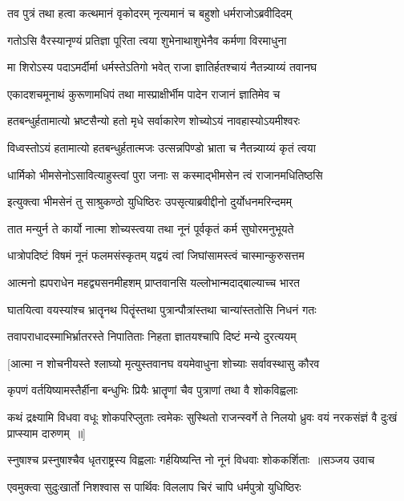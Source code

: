 \twolineshloka
{तव पुत्रं तथा हत्वा कत्थमानं वृकोदरम्}
{नृत्यमानं च बहुशो धर्मराजोऽब्रवीदिदम्}


\twolineshloka
{गतोऽसि वैरस्यानृण्यं प्रतिज्ञा पूरिता त्वया}
{शुभेनाथाशुभेनैव कर्मणा विरमाधुना}


\twolineshloka
{मा शिरोऽस्य पदाऽमर्दीर्मा धर्मस्तेऽतिगो भवेत्}
{राजा ज्ञातिर्हतश्चायं नैतन्न्याय्यं तवानघ}


\twolineshloka
{एकादशचमूनाथं कुरूणामधिपं तथा}
{मास्प्राक्षीर्भीम पादेन राजानं ज्ञातिमेव च}


\twolineshloka
{हतबन्धुर्हतामात्यो भ्रष्टसैन्यो हतो मृधे}
{सर्वाकारेण शोच्योऽयं नावहास्योऽयमीश्वरः}


\twolineshloka
{विध्वस्तोऽयं हतामात्यो हतबन्धुर्हतात्मजः}
{उत्सन्नपिण्डो भ्राता च नैतन्न्याय्यं कृतं त्वया}


\twolineshloka
{धार्मिको भीमसेनोऽसावित्याहुस्त्वां पुरा जनाः}
{स कस्माद्भीमसेन त्वं राजानमधितिष्ठसि}


\twolineshloka
{इत्युक्त्वा भीमसेनं तु साश्रुकण्ठो युधिष्ठिरः}
{उपसृत्याब्रवीद्दीनो दुर्योधनमरिन्दमम्}


\twolineshloka
{तात मन्युर्न ते कार्यो नात्मा शोच्यस्त्वया तथा}
{नूनं पूर्वकृतं कर्म सुघोरमनुभूयते}


\twolineshloka
{धात्रोपदिष्टं विषमं नूनं फलमसंस्कृतम्}
{यद्वयं त्वां जिघांसामस्त्वं चास्मान्कुरुसत्तम}


\twolineshloka
{आत्मनो ह्यपराधेन महद्व्यसनमीहशम्}
{प्राप्तवानसि यल्लोभान्मदाद्बाल्याच्च भारत}


\twolineshloka
{घातयित्वा वयस्यांश्च भ्रातॄनथ पितॄंस्तथा}
{पुत्रान्पौत्रांस्तथा चान्यांस्ततोसि निधनं गतः}


\twolineshloka
{तवापराधादस्माभिर्भ्रातरस्ते निपातिताः}
{निहता ज्ञातयश्चापि दिष्टं मन्ये दुरत्ययम्}


\twolineshloka
{[आत्मा न शोचनीयस्ते श्लाघ्यो मृत्युस्तवानघ}
{वयमेवाधुना शोच्याः सर्वावस्थासु कौरव}


\twolineshloka
{कृपणं वर्तयिष्यामस्तैर्हीना बन्धुभिः प्रियैः}
{भ्रातॄणां चैव पुत्राणां तथा वै शोकविह्वलाः}


\threelineshloka
{कथं द्रक्ष्यामि विधवा वधूः शोकपरिप्लुताः}
{त्वमेकः सुस्थितो राजन्स्वर्गे ते निलयो ध्रुवः}
{वयं नरकसंज्ञं वै दुःखं प्राप्स्याम दारुणम् ॥]}


\threelineshloka
{स्नुषाश्च प्रस्नुषाश्चैव धृतराष्ट्रस्य विह्वलाः}
{गर्हयिष्यन्ति नो नूनं विधवाः शोककर्शिताः ॥सञ्जय उवाच}
{}


\twolineshloka
{एवमुक्त्वा सुदुःखार्तो निशश्वास स पार्थिवः}
{विललाप चिरं चापि धर्मपुत्रो युधिष्ठिरः}


